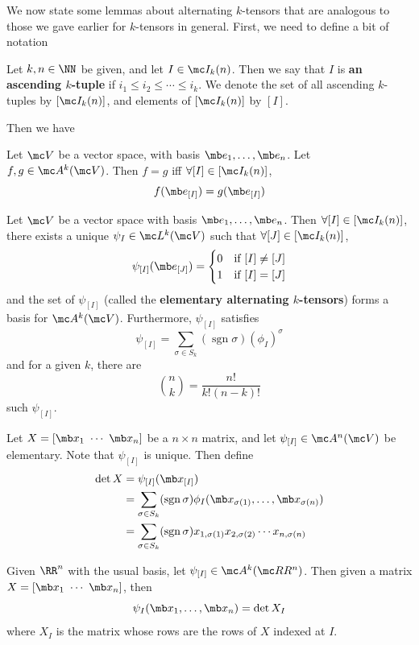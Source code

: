 \documentclass{fkbook}
\theoremstyle{snazzydefinition}
\DeclareMathOperator{\sgn}{sgn}
\begin{document}
  We now state some lemmas about alternating $k$-tensors that are
  analogous to those we gave earlier for $k$-tensors in general.
  First, we need to define a bit of notation
  \begin{definition}
    Let $k,n \in \NN$ be given, and let $I \in \mc I_k(n)$. Then we
    say that $I$ is \textbf{an ascending $k$-tuple} if $i_1 \leq i_2
    \leq \cdots \leq i_k$. We denote the set of all ascending
    $k$-tuples by $[\mc I_k(n)]$, and elements of $[\mc I_k(n)]$ by
    $[I]$.
  \end{definition}
  Then we have
  \begin{lemma}
    Let $\mc V$ be a vector space, with basis $\mb e_1, \ldots, \mb
    e_n$. Let $f,g \in \mc A^k(\mc V)$. Then $f = g$ iff $\forall [I]
    \in [\mc I_k(n)]$,
    \[
      f(\mb e_{[I]}) = g(\mb e_{[I]})
    \]
  \end{lemma}
  \begin{theorem}
    Let $\mc V$ be a vector space with basis $\mb e_1, \ldots, \mb
    e_n$. Then $\forall [I] \in [\mc I_k(n)]$, there exists a unique
    $\psi_I \in \mc L^k(\mc V)$ such that $\forall [J] \in [\mc
    I_k(n)]$,
    \[
      \psi_{[I]}(\mb e_{[J]}) =
      \begin{cases}
        0 & \text{if } [I] \neq [J] \\
        1 & \text{if } [I] = [J]
      \end{cases}
    \]
    and the set of $\psi_{[I]}$ (called the \textbf{elementary
      alternating $k$-tensors}) forms a basis for $\mc A^k(\mc V)$.
    Furthermore, $\psi_{[I]}$ satisfies
    \[
      \psi_{[I]} = \sum_{\sigma \in S_k} (\sgn \sigma) (\phi_I)^\sigma
    \]
    and for a given $k$, there are
    \[
      {n \choose k} = \frac{n!}{k!(n-k)!}
    \]
    such $\psi_{[I]}$.
  \end{theorem}
  \begin{definition}[Determinant]
    Let $X = [\mb x_1\ \cdots\ \mb x_n]$ be a $n\times n$ matrix, and
    let $\psi_{[I]} \in \mc A^n(\mc V)$ be elementary. Note that
    $\psi_{[I]}$ is unique. Then define
    \begin{align*}
      \det X
      &= \psi_{[I]} (\mb x_{[I]}) \\
      &= \sum_{\sigma \in S_k} (\sgn \sigma) \phi_I(\mb x_{\sigma(1)},
        \ldots, \mb x_{\sigma(n)}) \\
      &= \sum_{\sigma \in S_k} (\sgn \sigma) x_{1,\sigma(1)}
        x_{2,\sigma(2)} \cdots x_{n,\sigma(n)}
    \end{align*}
  \end{definition}
  \begin{corollary}
    Given $\RR^n$ with the usual basis, let $\psi_{[I]} \in \mc
    A^k(\mc RR^n)$. Then given a matrix $X = [\mb x_1\ \cdots\ \mb
    x_n]$, then
    \[
      \psi_I(\mb x_1, \ldots, \mb x_n) = \det X_I
    \]
    where $X_I$ is the matrix whose rows are the rows of $X$ indexed
    at $I$.
  \end{corollary}
\end{document}
